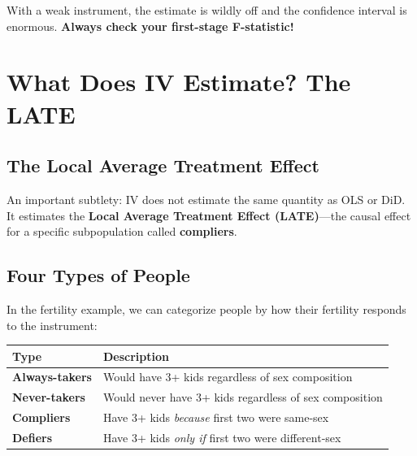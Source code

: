 \documentclass[
  letterpaper,
  DIV=11,
  numbers=noendperiod]{scrreprt}
\newcounter{none} %
\begin{document}
With a weak instrument, the estimate is wildly off and the confidence
interval is enormous. \textbf{Always check your first-stage
F-statistic!}

\section{What Does IV Estimate? The
LATE}\label{what-does-iv-estimate-the-late}

\subsection{The Local Average Treatment
Effect}\label{the-local-average-treatment-effect}

An important subtlety: IV does not estimate the same quantity as OLS or
DiD. It estimates the \textbf{Local Average Treatment Effect
(LATE)}---the causal effect for a specific subpopulation called
\textbf{compliers}.

\subsection{Four Types of People}\label{four-types-of-people}

In the fertility example, we can categorize people by how their
fertility responds to the instrument:

{\def\LTcaptype{none} %
\begin{longtable}[]{@{}
  >{\raggedright\arraybackslash}p{}
  >{\raggedright\arraybackslash}p{}@{}}
\toprule\noalign{}
\begin{minipage}[b]{\linewidth}\raggedright
Type
\end{minipage} & \begin{minipage}[b]{\linewidth}\raggedright
Description
\end{minipage} \\
\midrule\noalign{}
\endhead
\bottomrule\noalign{}
\endlastfoot
\textbf{Always-takers} & Would have 3+ kids regardless of sex
composition \\
\textbf{Never-takers} & Would never have 3+ kids regardless of sex
composition \\
\textbf{Compliers} & Have 3+ kids \emph{because} first two were
same-sex \\
\textbf{Defiers} & Have 3+ kids \emph{only if} first two were
different-sex \\
\end{longtable}
}
\end{document}
